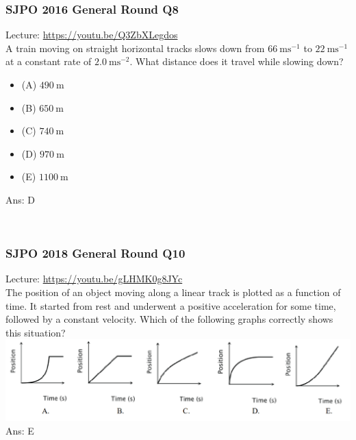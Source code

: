 \documentclass{article}
\begin{document}
\begin{samepage}
\subsubsection{SJPO 2016 General Round Q8}
Lecture: \url{https://youtu.be/Q3ZbXLegdos} \\[10pt]
A train moving on straight horizontal tracks slows down from $66 \mathrm{~ms}^{-1}$ to $22 \mathrm{~ms}^{-1}$ at a constant rate of $2.0 \mathrm{~ms}^{-2}$. What distance does it travel while slowing down?
\begin{itemize}
\item[](A) $490 \mathrm{~m}$
\item[](B) $650 \mathrm{~m}$
\item[](C) $740 \mathrm{~m}$
\item[](D) $970 \mathrm{~m}$ 
\item[](E) $1100 \mathrm{~m}$ \end{itemize}
Ans: \ifpaper D \fi
\end{samepage}
\\[20pt]
\begin{samepage}
\subsubsection{SJPO 2018 General Round Q10} 
Lecture: \url{https://youtu.be/gLHMK0g8JYc} \\[10pt]
The position of an object moving along a linear track is plotted as a function of time. It started from rest and underwent a positive acceleration for some time, followed by a constant velocity. Which of the following graphs correctly shows this situation?\\
\includegraphics[width=\linewidth]{2018q10.png}\\
Ans: \ifpaper E \fi\\
\end{samepage}
\end{document}
